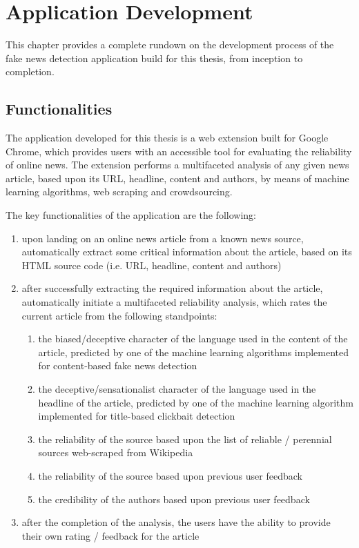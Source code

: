 \section{Application Development}
This chapter provides a complete rundown on the development process of the fake news detection application build for this thesis, from inception to completion.

\subsection{Functionalities}
  The application developed for this thesis is a web extension built for Google Chrome, which provides users with an accessible tool for evaluating the reliability of online news. The extension performs a multifaceted analysis of any given news article, based upon its URL, headline, content and authors, by means of machine learning algorithms, web scraping and crowdsourcing.

  The key functionalities of the application are the following:
  \begin{enumerate}
    \item upon landing on an online news article from a known news source, automatically extract some critical information about the article, based on its HTML source code (i.e. URL, headline, content and authors)
    \item after successfully extracting the required information about the article, automatically initiate a multifaceted reliability analysis, which rates the current article from the following standpoints:
    \begin{enumerate}
      \item the biased/deceptive character of the language used in the content of the article, predicted by one of the machine learning algorithms implemented for content-based fake news detection
      \item the deceptive/sensationalist character of the language used in the headline of the article, predicted by one of the machine learning algorithm implemented for title-based clickbait detection
      \item the reliability of the source based upon the list of reliable / perennial sources web-scraped from Wikipedia \cite{wiki_reliable_sources}
      \item the reliability of the source based upon previous user feedback
      \item the credibility of the authors based upon previous user feedback
    \end{enumerate}
    \item after the completion of the analysis, the users have the ability to provide their own rating / feedback for the article
  \end{enumerate}

